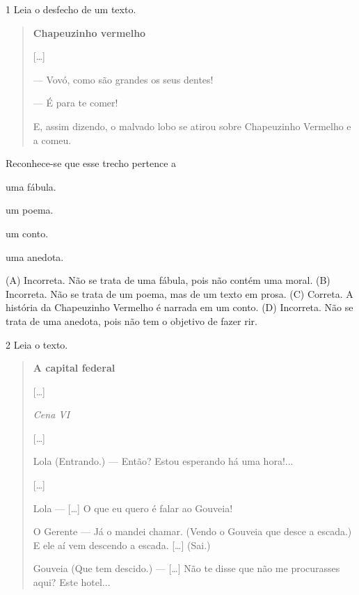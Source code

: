 \num{1} Leia o desfecho de um texto.

\begin{quote}
\textbf{Chapeuzinho vermelho}

{[}\ldots{}{]}

--- Vovó, como são grandes os seus dentes!

--- É para te comer!

E, assim dizendo, o malvado lobo se atirou sobre Chapeuzinho Vermelho e a
comeu.

\end{quote}

Reconhece-se que esse trecho pertence a

\begin{escolha}
\item uma fábula.

\item um poema.

\item um conto.

\item uma anedota.
\end{escolha}


(A) Incorreta. Não se trata de uma fábula, pois não contém uma moral.
(B) Incorreta. Não se trata de um poema, mas de um texto em prosa.
(C) Correta. A história da Chapeuzinho Vermelho é narrada em um conto.
(D) Incorreta. Não se trata de uma anedota, pois não tem o objetivo de fazer rir.

\num{2} Leia o texto.

\begin{quote}
\textbf{A capital federal}

{[}\ldots{}{]}

\textit{Cena VI}

{[}\ldots{}{]}

Lola (Entrando.) --- Então? Estou esperando há uma hora!...

{[}\ldots{}{]}

Lola --- {[}\ldots{}{]} O que eu quero é falar ao Gouveia!

O Gerente --- Já o mandei chamar. (Vendo o Gouveia que desce a escada.)
E ele aí vem descendo a escada. {[}\ldots{}{]} (Sai.)

Gouveia (Que tem descido.) --- {[}\ldots{}{]} Não te disse que não me
procurasses aqui? Este hotel...

\end{quote}

